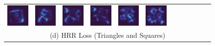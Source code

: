 \documentclass[letterpaper]{article} %
\begin{document}
\begin{figure}[!htbp]
\begin{tabular}{cccccccccccc}
\multicolumn{1}{c}{\includegraphics[width=0.125\columnwidth]{saliency/hrr/circle/square_1.png}} \hspace{-12pt} &  \multicolumn{1}{c}{\includegraphics[width=0.125\columnwidth]{saliency/hrr/circle/square_2.png}} \hspace{-12pt} & \multicolumn{1}{c}{\includegraphics[width=0.125\columnwidth]{saliency/hrr/circle/square_3.png}} \hspace{-12pt} & \multicolumn{1}{c}{\includegraphics[width=0.125\columnwidth]{saliency/hrr/circle/square_4.png}} \hspace{-12pt} & \multicolumn{1}{c}{\includegraphics[width=0.125\columnwidth]{saliency/hrr/circle/square_5.png}} \hspace{-12pt} & \multicolumn{1}{c}{\includegraphics[width=0.125\columnwidth]{saliency/hrr/circle/square_6.png}} \\ 
\multicolumn{12}{c}{(d) HRR Loss (Triangles and Squares)} \\


\end{tabular}
\end{figure}
\end{document}
